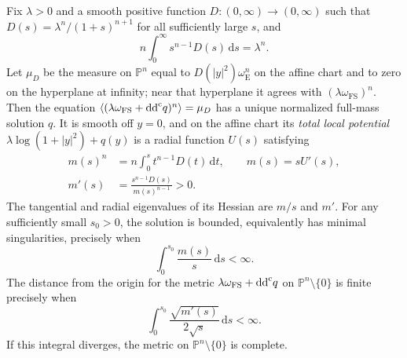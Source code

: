 \begin{theorem}\label{thm:inverse-radial}
Fix $\lambda>0$ and a smooth positive function $D:(0,\infty)\to(0,\infty)$ such that $D(s)=\lambda^n/(1+s)^{n+1}$ for all sufficiently large $s$, and
\begin{equation}\label{eq:radial-total-mass}
 n\int_0^\infty s^{n-1}D(s)\,\mathrm{d} s=\lambda^n.
\end{equation}
Let $\mu_D$ be the measure on $\mathbb P^n$ equal to $D(|y|^2)\omega_{\mathrm E}^n$ on the affine chart and to zero on the hyperplane at infinity; near that hyperplane it agrees with $(\lambda\omega_{\mathrm{FS}})^n$. Then the equation $\langle(\lambda\omega_{\mathrm{FS}}+\mathrm{dd}^{\mathrm{c}} q)^n\rangle=\mu_D$ has a unique normalized full-mass solution $q$. It is smooth off $y=0$, and on the affine chart its \emph{total local potential} $\lambda\log(1+|y|^2)+q(y)$ is a radial function $U(s)$ satisfying
\begin{equation}\label{eq:radial-mass-ode}
\begin{aligned}
 m(s)^n&=n\int_0^s t^{n-1}D(t)\,\mathrm{d} t,\qquad m(s)=sU'(s),\\
 m'(s)&=\frac{s^{n-1}D(s)}{m(s)^{n-1}}>0.
\end{aligned}
\end{equation}
The tangential and radial eigenvalues of its Hessian are $m/s$ and $m'$. For any sufficiently small $s_0>0$, the solution is bounded, equivalently has minimal singularities, precisely when
\begin{equation}\label{eq:radial-bounded-criterion}
 \int_0^{s_0}\frac{m(s)}s\,\mathrm{d} s<\infty.
\end{equation}
The distance from the origin for the metric $\lambda\omega_{\mathrm{FS}}+\mathrm{dd}^{\mathrm{c}} q$ on $\mathbb P^n\setminus\{0\}$ is finite precisely when
\begin{equation}\label{eq:radial-distance-criterion}
 \int_0^{s_0}\frac{\sqrt{m'(s)}}{2\sqrt{s}}\,\mathrm{d} s<\infty.
\end{equation}
If this integral diverges, the metric on $\mathbb P^n\setminus\{0\}$ is complete.


\end{theorem}

